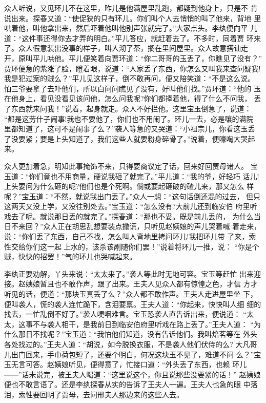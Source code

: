 众人听说，又见环儿不在这里，昨儿是他满屋里乱跑，都疑到他身上，只是不
肯说出来。探春又道：“使促狭的只有环儿。你们叫个人去悄悄的叫了他来，背地
里哄着他，叫他拿出来，然后吓着他叫他别声张就完了。”大家点头。李纨便向平
儿道：“这件事还得你去才弄的明白。”平儿答应，就赶着去了。不多时，同着贾
环来了。众人假意装出没事的样子，叫人沏了茶，搁在里间屋里。众人故意搭讪走
开，原叫平儿哄他。平儿便笑着向贾环道：“你二哥哥的玉丢了，你瞧见了没有？”
贾环便急的紫涨了脸，瞪着眼，说道：“人家丢了东西，你怎么又叫我来查问疑我!
我是犯过案的贼么？”平儿见这样子，倒不敢再问，便又陪笑道：“不是这么说。
怕三爷要拿了去吓他们，所以白问问瞧见了没有，好叫他们找。”贾环道：“他的
玉在他身上，看见没看见该问他，怎么问我呢?你们都捧着他，得了什么不问我，
丢了东西就来问我！”说着，起身就走。众人不好拦他。这里宝玉倒急了，说道：
“都是这劳什子闹事!我也不要他了，你们也不用闹了。环儿一去，必是嚷的满院
里都知道了，这可不是闹事了么？”袭人等急的又哭道：“小祖宗儿，你看这玉丢
了没要紧；要是上头知道了，我们这些人就要粉身碎骨了。”说着，便嚎啕大哭起
来。

众人更加着急，明知此事掩饰不来，只得要商议定了话，回来好回贾母诸人。
宝玉道：“你们竟也不用商量，硬说我砸了就完了。”平儿道：“我的爷，好轻巧
话儿!上头要问为什么砸的呢?他们也是个死啊。倘或要起砸破的碴儿来，那又怎么
样呢？”宝玉道：“不然，就说我出门丢了。”众人一想：“这句话倒还混的过去，
但只这两天又没上学，又没往别处去。”宝玉道：“怎么没有?大前儿还到临安伯
府里听戏去了呢。就说那日丢的就完了。”探春道：“那也不妥。既是前儿丢的，
为什么当日不来回？”众人正在胡思乱想要装点撒谎，只听见赵姨娘的声儿哭着喊
着走来，说：“你们丢了东西，自己不找，怎么叫人背地里拷问环儿!我把环儿带
了来，索性交给你们这一起上水的，该杀该剐随你们罢！”说着将环儿一推，说：
“你是个贼，快快的招罢！”气的环儿也哭喊起来。

李纨正要劝解，丫头来说：“太太来了。”袭人等此时无地可容。宝玉等赶忙
出来迎接。赵姨娘暂且也不敢作声，跟了出来。王夫人见众人都有惊惶之色，才信
方才听见的话，便道：“那块玉真丢了么？”众人都不敢作声。王夫人走进屋里坐
下，便叫袭人，慌的袭人连忙跪下，含泪要禀。王夫人道：“你起来，快快叫人细
细的找去，一忙乱倒不好了。”袭人哽咽难言。宝玉恐袭人直告诉出来，便说道：
“太太，这事不与袭人相干，是我前日到临安伯府里听戏在路上丢了。”王夫人道：
“为什么那日不找呢？”宝玉道：“我怕他们知道，没有告诉他们。我叫焙茗等在
外头各处找过的。”王夫人道：“胡说，如今脱换衣服，不是袭人他们伏侍的么?
大凡哥儿出门回来，手巾荷包短了，还要个明白，何况这块玉不见了，难道不问
么？”宝玉无言可答。赵姨娘听见，便得意了，忙接口道：“外头丢了东西，也赖
环儿——”话未说完，被王夫人喝道：“这里说这个，你且说那些没要紧的话！”
赵姨娘便也不敢言语了。还是李纨探春从实的告诉了王夫人一遍。王夫人也急的眼
中落泪，索性要回明了贾母，去问邢夫人那边来的这些人去。

